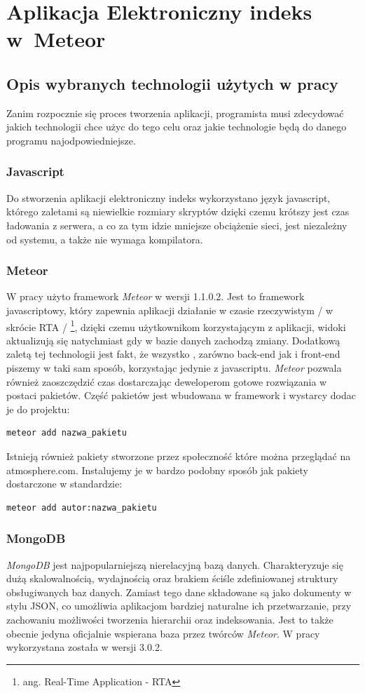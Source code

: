 \documentclass{xmgr}
\begin{document}
\chapter{Aplikacja Elektroniczny indeks w~Meteor}
\section{Opis wybranych technologii użytych w pracy}
Zanim rozpocznie się proces tworzenia aplikacji, programista musi zdecydować jakich technologii chce użyc do tego celu oraz jakie technologie będą do danego programu najodpowiedniejsze.
\subsection{Javascript}
Do stworzenia aplikacji elektroniczny indeks wykorzystano język javascript, którego zaletami są niewielkie rozmiary skryptów dzięki czemu krótszy jest czas ładowania z serwera, a co za tym idzie mniejsze obciążenie sieci, jest niezależny od systemu, a także nie wymaga kompilatora.
\subsection{Meteor}
W pracy użyto framework \textit{Meteor} w wersji 1.1.0.2. Jest to framework javascriptowy, który zapewnia aplikacji działanie w czasie rzeczywistym / w skrócie RTA / \footnote{ang. Real-Time Application - RTA}, dzięki czemu użytkownikom korzystającym z aplikacji, widoki aktualizują się natychmiast gdy w bazie danych zachodzą zmiany. Dodatkową zaletą tej technologii jest fakt, że wszystko , zarówno back-end jak i front-end piszemy w taki sam sposób, korzystając jedynie z javascriptu. \textit{Meteor} pozwala również zaoszczędzić czas dostarczając deweloperom gotowe rozwiązania w postaci pakietów. Część pakietów jest wbudowana w framework i wystarcy dodac je do projektu: 
\begin{lstlisting}[language=bash,caption={Dodanie standardowego pakietu do projektu}]
	meteor add nazwa_pakietu
\end{lstlisting}
Istnieją również pakiety stworzone przez społeczność które można przeglądać na atmosphere.com. Instalujemy je w bardzo podobny sposób jak pakiety dostarczone w standardzie:
\begin{lstlisting}[language=bash,caption={Dodanie zewnętrznego pakietu do projektu}]
	meteor add autor:nazwa_pakietu
\end{lstlisting}

\subsection{MongoDB}
\textit{MongoDB} jest najpopularniejszą nierelacyjną bazą danych. Charakteryzuje się dużą skalowalnością, wydajnością oraz brakiem ściśle zdefiniowanej struktury obsługiwanych baz danych. Zamiast tego dane składowane są jako dokumenty w stylu JSON, co umożliwia aplikacjom bardziej naturalne ich przetwarzanie, przy zachowaniu możliwości tworzenia hierarchii oraz indeksowania. Jest to także obecnie jedyna oficjalnie wspierana baza przez twórców \textit{Meteor}.  W pracy wykorzystana została w wersji 3.0.2.
\end{document}
